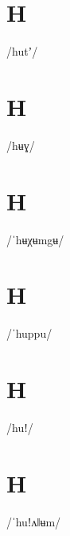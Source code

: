 \documentclass[10pt,a4paper,twoside]{book}
\begin{document}
\section*{H}

\begin{multicols}{3}
 {/hutʼ/} {}
\end{multicols}

\section*{H}

\begin{multicols}{3}
 {/hʉɣ/} {}
\end{multicols}

\section*{H}

\begin{multicols}{3}
 {/ˈhʉχʉmgʉ/} {}
\end{multicols}

\section*{H}

\begin{multicols}{3}
 {/ˈhuppu/} {}
\end{multicols}

\section*{H}

\begin{multicols}{3}
 {/huǃ/} {}
\end{multicols}

\section*{H}

\begin{multicols}{3}
 {/ˈhuǃʌǁʉm/} {}
\end{multicols}
\end{document}
